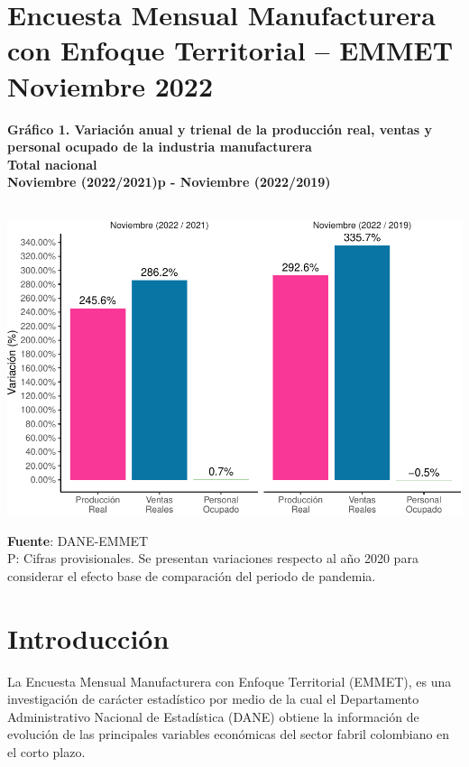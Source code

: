 \documentclass[
]{article}
\author{}
\date{\vspace{-2.5em}}
\begin{document}
\hypertarget{encuesta-mensual-manufacturera-con-enfoque-territorial-emmet-noviembre-2022}{%
\section*{Encuesta Mensual Manufacturera con Enfoque Territorial --
EMMET Noviembre
2022}\label{encuesta-mensual-manufacturera-con-enfoque-territorial-emmet-noviembre-2022}}

\textbf{Gráfico 1. Variación anual y trienal de la producción real,
ventas y personal ocupado de la industria manufacturera}\\
\textbf{Total nacional}\\
\textbf{Noviembre (2022/2021)p - Noviembre (2022/2019)}\\
\strut \\

\includegraphics{boletin_files/figure-latex/variacion-1.pdf}

\textbf{Fuente}: DANE-EMMET\\
P: Cifras provisionales. Se presentan variaciones respecto al año 2020
para considerar el efecto base de comparación del periodo de pandemia.

\renewcommand\contentsname{}
\setcounter{tocdepth}{1}
\tableofcontents

\newpage

\hypertarget{introducciuxf3n}{%
\section*{Introducción}\label{introducciuxf3n}}

La Encuesta Mensual Manufacturera con Enfoque Territorial (EMMET), es
una investigación de carácter estadístico por medio de la cual el
Departamento Administrativo Nacional de Estadística (DANE) obtiene la
información de evolución de las principales variables económicas del
sector fabril colombiano en el corto plazo.
\end{document}
